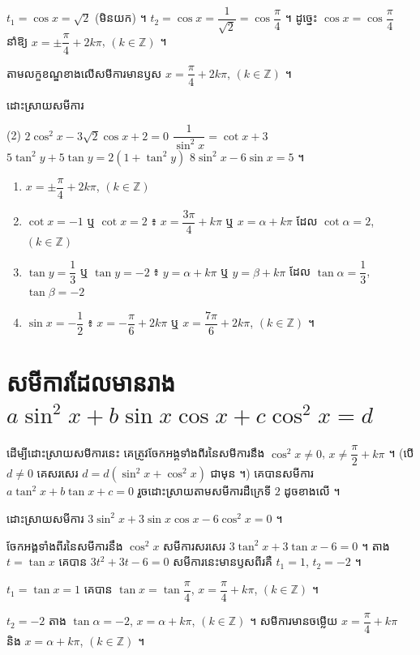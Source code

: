 $t_1 = \cos x = \sqrt{2}$ (មិនយក) ។ $t_2 = \cos x = \dfrac{1}{\sqrt{2}} = \cos\dfrac{\pi}{4}$ ។ ដូច្នេះ $\cos x = \cos\dfrac{\pi}{4}$ នាំឱ្យ $x = \pm\dfrac{\pi}{4} + 2k\pi$, $(k \in \mathbb{Z})$ ។

តាមលក្ខខណ្ឌខាងលើសមីការមានឫស $x = \dfrac{\pi}{4} + 2k\pi$, $(k \in \mathbb{Z})$ ។

\begin{pro}
ដោះស្រាយសមីការ
\begin{tasks}(2)
  \task $2\cos^2 x - 3\sqrt{2}\cos x + 2 = 0$
  \task $\dfrac{1}{\sin^2 x} = \cot x + 3$
  \task $5\tan^2 y + 5\tan y = 2(1 + \tan^2 y)$
  \task $8\sin^2 x - 6\sin x = 5$ ។
\end{tasks}
\ans
\begin{enumerate}[a]
  \item $x = \pm\dfrac{\pi}{4} + 2k\pi$, $(k \in \mathbb{Z})$
  \item $\cot x = -1$ ឬ $\cot x = 2$ ៖ $x = \dfrac{3\pi}{4} + k\pi$ ឬ $x = \alpha + k\pi$ ដែល $\cot\alpha = 2$, $(k \in \mathbb{Z})$
  \item $\tan y = \dfrac{1}{3}$ ឬ $\tan y = -2$ ៖ $y = \alpha + k\pi$ ឬ $y = \beta + k\pi$ ដែល $\tan\alpha = \dfrac{1}{3}$, $\tan\beta = -2$
  \item $\sin x = -\dfrac{1}{2}$ ៖ $x = -\dfrac{\pi}{6} + 2k\pi$ ឬ $x = \dfrac{7\pi}{6} + 2k\pi$, $(k \in \mathbb{Z})$ ។
\end{enumerate}
\end{pro}

\section{សមីការដែលមានរាង \texorpdfstring{$a\sin^2 x + b\sin x\cos x + c\cos^2 x = d$}{a sin²x + b sin x cos x + c cos²x = d}}

ដើម្បីដោះស្រាយសមីការនេះ គេត្រូវចែកអង្គទាំងពីរនៃសមីការនឹង $\cos^2 x \ne 0$, $x \ne \dfrac{\pi}{2} + k\pi$ ។ (បើ $d \ne 0$ គេសរសេរ $d = d(\sin^2 x + \cos^2 x)$ ជាមុន ។) គេបានសមីការ $a\tan^2 x + b\tan x + c = 0$ រួចដោះស្រាយតាមសមីការដឺក្រេទី $2$ ដូចខាងលើ ។

\begin{example}[ឧទាហរណ៍ ១]
ដោះស្រាយសមីការ $3\sin^2 x + 3\sin x\cos x - 6\cos^2 x = 0$ ។

ចែកអង្គទាំងពីរនៃសមីការនឹង $\cos^2 x$ សមីការសរសេរ $3\tan^2 x + 3\tan x - 6 = 0$ ។ តាង $t = \tan x$ គេបាន $3t^2 + 3t - 6 = 0$ សមីការនេះមានឫសពីរគឺ $t_1 = 1$, $t_2 = -2$ ។

$t_1 = \tan x = 1$ គេបាន $\tan x = \tan\dfrac{\pi}{4}$, $x = \dfrac{\pi}{4} + k\pi$, $(k \in \mathbb{Z})$ ។

$t_2 = -2$ តាង $\tan\alpha = -2$, $x = \alpha + k\pi$, $(k \in \mathbb{Z})$ ។ សមីការមានចម្លើយ $x = \dfrac{\pi}{4} + k\pi$ និង $x = \alpha + k\pi$, $(k \in \mathbb{Z})$ ។
\end{example}

